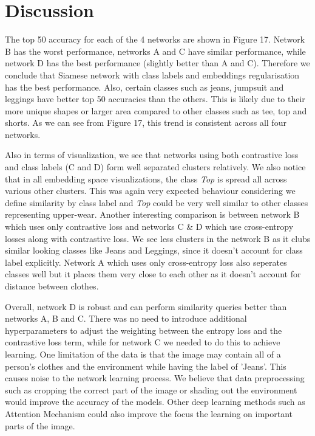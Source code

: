 \documentclass{article}
\begin{document}
\section{Discussion}


The top 50 accuracy for each of the 4 networks are shown in Figure 17. Network B has the worst performance, networks A and C have similar performance, while network D has the best performance (slightly better than A and C). Therefore we conclude that Siamese network with class labels and embeddings regularisation has the best performance. Also, certain classes such as jeans, jumpsuit and leggings have better top 50 accuracies than the others. This is likely due to their more unique shapes or larger area compared to other classes such as tee, top and shorts. As we can see from Figure 17, this trend is consistent across all four networks.

Also in terms of visualization, we see that networks using both contrastive loss and class labels (C and D) form well separated clusters relatively. We also notice that in all embedding space visualizations, the class \textit{Top} is spread all across various other clusters. This was again very expected behaviour considering we define similarity by class label and \textit{Top} could be very well similar to other classes representing upper-wear. Another interesting comparison is between network B which uses only contrastive loss and networks C & D which use cross-entropy losses along with contrastive loss. We see less clusters in the network B as it clubs similar looking classes like Jeans and Leggings, since it doesn't account for class label explicitly. Network A which uses only cross-entropy loss also seperates classes well but it places them very close to each other as it doesn't account for distance between clothes.

Overall, network D is robust and can perform similarity queries better than networks A, B and C. There was no need to introduce additional hyperparameters to adjust the weighting between the entropy loss and the contrastive loss term, while for network C we needed to do this to achieve learning. One limitation of the data is that the image may contain all of a person's clothes and the environment while having the label of 'Jeans'. This causes noise to the network learning process. We believe that data preprocessing such as cropping the correct part of the image or shading out the environment would improve the accuracy of the models. Other deep learning methods such as Attention Mechanism could also improve the focus the learning on important parts of the image.
\end{document}

